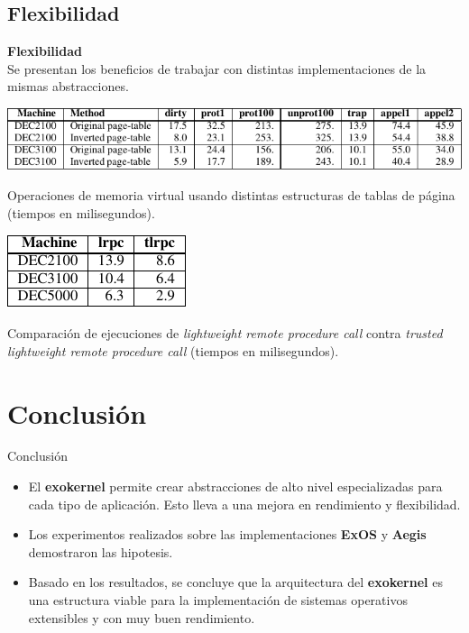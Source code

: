 \documentclass[10pt]{beamer}
\begin{document}
\subsection{Flexibilidad}

\begin{frame}
\textbf{Flexibilidad} \\[2em]
Se presentan los beneficios de trabajar con distintas implementaciones de la mismas abstracciones. 
\begin{table}
 \includegraphics[scale=0.8]{grafico-pages.pdf}
\caption{Operaciones de memoria virtual usando distintas estructuras de tablas de página (tiempos en milisegundos).}
\end{table}

\begin{table}
\includegraphics[scale=0.8]{grafico-tlrpc.pdf}
\caption{Comparación de ejecuciones de \emph{lightweight remote procedure call} contra \emph{trusted lightweight remote procedure call} (tiempos en milisegundos).}
\end{table}
\end{frame}

\section{Conclusión}

\begin{frame}{Conclusión}
\begin{itemize}
  \item El \textbf{exokernel} permite crear abstracciones de alto nivel especializadas para cada tipo de aplicación. Esto lleva a una mejora en rendimiento y flexibilidad.
  \item Los experimentos realizados sobre las implementaciones \textbf{ExOS} y \textbf{Aegis} demostraron las hipotesis.
  \item Basado en los resultados, se concluye que la arquitectura del \textbf{exokernel} es una estructura viable para la implementación de sistemas operativos extensibles y con muy buen rendimiento.
\end{itemize}
\end{frame}



\end{document}
